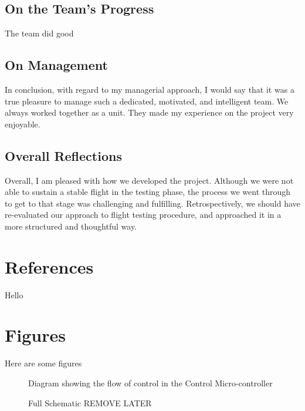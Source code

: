 \documentclass[a4paper,11pt]{article}
\begin{document}
\subsection{On the Team's Progress}
The team did good
\subsection{On Management}
In conclusion, with regard to my managerial approach, I would say that it was a true pleasure to manage such a dedicated, motivated, and intelligent team. We always worked together as a unit. They made my experience on the project very enjoyable.
\subsection{Overall Reflections}
Overall, I am pleased with how we developed the project. Although we were not able to sustain a stable flight in the testing phase, the process we went through to get to that stage was challenging and fulfilling. 
Retrospectively, we should have re-evaluated our approach to flight testing procedure, and approached it in a more structured and thoughtful way.




\appendix
\newpage
\section{References}
Hello

\section{Figures}
Here are some figures
\begin{figure}[!h]
    
    \caption{Diagram showing the flow of control in the Control Micro-controller}
    \label{fig:Control Flow}
\end{figure}
\newpage
\begin{figure}[!h]
    
    \caption{Full Schematic REMOVE LATER}
\end{figure}

  
\end{document}
